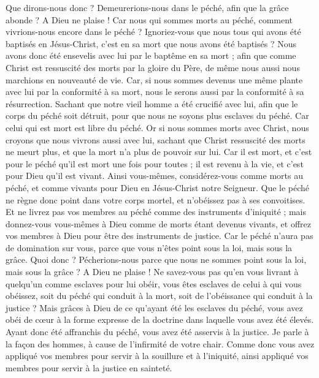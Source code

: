 \begin{multicols}{2}
\VerseOne{}Que dirons-nous donc ? Demeurerions-nous dans le péché, afin que la grâce abonde ?
A Dieu ne plaise ! Car nous qui sommes morts au péché, comment vivrions-nous encore dans le péché ?
Ignoriez-vous que nous tous qui avons été baptisés en Jésus-Christ, c’est en sa mort que nous avons été baptisés ?
Nous avons donc été ensevelis avec lui par le baptême en sa mort ; afin que comme Christ est ressuscité des morts par la gloire du Père, de même nous aussi nous marchions en nouveauté de vie.
Car, si nous sommes devenus une même plante avec lui par la conformité à sa mort, nous le serons aussi par la conformité à sa résurrection.
Sachant que notre vieil homme a été crucifié avec lui, afin que le corps du péché soit détruit, pour que nous ne soyons plus esclaves du péché.
Car celui qui est mort est libre du péché.
Or si nous sommes morts avec Christ, nous croyons que nous vivrons aussi avec lui,
sachant que Christ ressuscité des morts ne meurt plus, et que la mort n'a plus de pouvoir sur lui.
Car il est mort, et c’est pour le péché qu’il est mort une fois pour toutes ; il est revenu à la vie, et c’est pour Dieu qu’il est vivant.
Ainsi vous-mêmes, considérez-vous comme morts au péché, et comme vivants pour Dieu en Jésus-Christ notre Seigneur.
Que le péché ne règne donc point dans votre corps mortel, et n’obéissez pas à ses convoitises.
Et ne livrez pas vos membres au péché comme des instruments d'iniquité ; mais donnez-vous vous-mêmes à Dieu comme de morts étant devenus vivants, et offrez vos membres à Dieu pour être des instruments de justice.
Car le péché n'aura pas de domination sur vous, parce que vous n'êtes point sous la loi, mais sous la grâce.
Quoi donc ? Pécherions-nous parce que nous ne sommes point sous la loi, mais sous la grâce ? A Dieu ne plaise !
Ne savez-vous pas qu’en vous livrant à quelqu’un comme esclaves pour lui obéir, vous êtes esclaves de celui à qui vous obéissez, soit du péché qui conduit à la mort, soit de l'obéissance qui conduit à la justice ?
Mais grâces à Dieu de ce qu'ayant été les esclaves du péché, vous avez obéi de cœur à la forme expresse de la doctrine dans laquelle vous avez été élevés.
Ayant donc été affranchis du péché, vous avez été asservis à la justice.
Je parle à la façon des hommes, à cause de l'infirmité de votre chair. Comme donc vous avez appliqué vos membres pour servir à la souillure et à l’iniquité, ainsi appliqué vos membres pour servir à la justice en sainteté.

\end{multicols}
